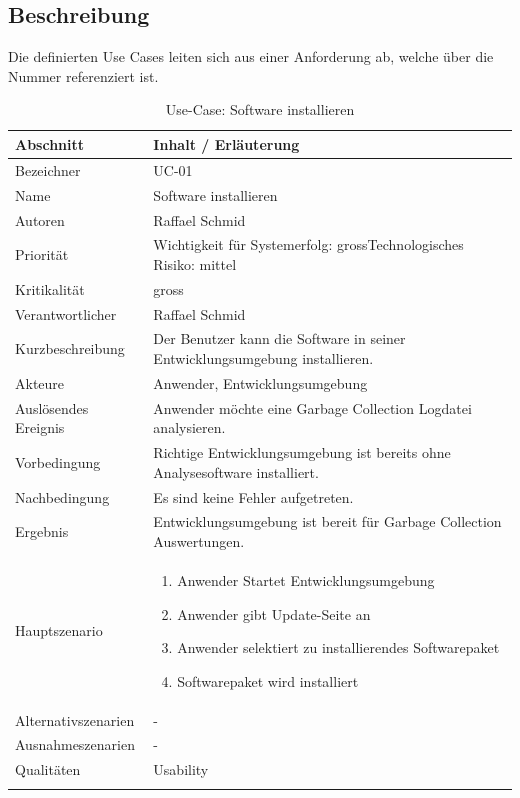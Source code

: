 \subsection{Beschreibung}
Die definierten Use Cases leiten sich aus einer Anforderung ab, welche über die Nummer referenziert ist.
\begin{longtable}{|p{4cm}|p{10.5cm}|}
  \hline
   \textbf{Abschnitt} & \textbf{Inhalt / Erläuterung} \\\hline
   Bezeichner & UC-01\\\hline
   Name & Software installieren\\\hline
   Autoren & Raffael Schmid\\\hline
   Priorität & Wichtigkeit für Systemerfolg: gross\newline Technologisches Risiko: mittel\\\hline
   Kritikalität & gross\\\hline
   Verantwortlicher & Raffael Schmid\\\hline
   Kurzbeschreibung & Der Benutzer kann die Software in seiner Entwicklungsumgebung installieren.\\\hline
   Akteure & Anwender, Entwicklungsumgebung\\\hline
   Auslösendes Ereignis & Anwender möchte eine Garbage Collection Logdatei analysieren.\\\hline
   Vorbedingung & Richtige Entwicklungsumgebung ist bereits ohne Analysesoftware installiert.\\\hline
   Nachbedingung & Es sind keine Fehler aufgetreten.\\\hline
   Ergebnis & Entwicklungsumgebung ist bereit für Garbage Collection Auswertungen.\\\hline
   Hauptszenario & 
         \begin{enumerate}
		\item Anwender Startet Entwicklungsumgebung
		\item Anwender gibt Update-Seite an
		\item Anwender selektiert zu installierendes Softwarepaket
		\item Softwarepaket wird installiert	
 	\end{enumerate}
	\\\hline
   Alternativszenarien & -\\\hline
   Ausnahmeszenarien & -\\\hline
   Qualitäten & Usability\\\hline
\caption{Use-Case: Software installieren}
\end{longtable}

